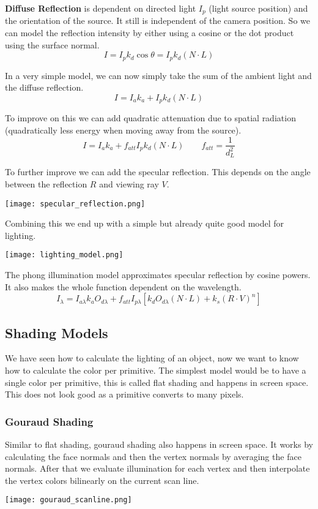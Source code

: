 \textbf{Diffuse Reflection} is dependent on directed light $I_p$ (light source position) and the orientation of the source. It still is independent of the camera position. So we can model the reflection intensity by either using a cosine or the dot product using the surface normal.
$$I = I_p k_d \cos \theta = I_p k_d (N \cdot L)$$

In a very simple model, we can now simply take the sum of the ambient light and the diffuse reflection. 
$$I = I_a k_a + I_p k_d (N \cdot L)$$

To improve on this we can add quadratic attenuation due to spatial radiation (quadratically less energy when moving away from the source).
$$I = I_a k_a + f_{att} I_p k_d (N \cdot L) \qquad f_{att} = \frac{1}{d_L^2}$$

To further improve we can add the specular reflection. This depends on the angle between the reflection $R$ and viewing ray $V$.
\begin{center}
	\texttt{[image: specular\_reflection.png]}
\end{center}

Combining this we end up with a simple but already quite good model for lighting.
\begin{center}
	\texttt{[image: lighting\_model.png]}
\end{center}

The phong illumination model approximates specular reflection by cosine powers. It also makes the whole function dependent on the wavelength.
$$I_\lambda = I_{a \lambda} k_a O_{d \lambda} + f_{att} I_{p \lambda} [k_d O_{d \lambda}(N \cdot L) + k_s (R \cdot V)^n]$$


\subsection{Shading Models}

We have seen how to calculate the lighting of an object, now we want to know how to calculate the color per primitive. The simplest model would be to have a single color per primitive, this is called flat shading and happens in screen space. This does not look good as a primitive converts to many pixels.

\subsubsection{Gouraud Shading}

Similar to flat shading, gouraud shading also happens in screen space. It works by calculating the face normals and then the vertex normals by averaging the face normals. After that we evaluate illumination for each vertex and then interpolate the vertex colors bilinearly on the current scan line.
\begin{center}
	\texttt{[image: gouraud\_scanline.png]}
\end{center}

